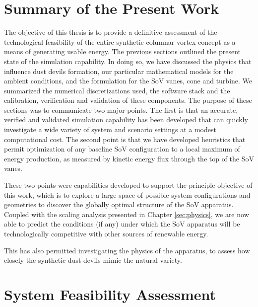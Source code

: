 \label{sec:conclusions}

%
%

%
%

\section{Summary of the Present Work}

The objective of this thesis is to provide a definitive assessment of
the technological feasibility of the entire synthetic columnar vortex
concept as a means of generating usable energy. The previous sections
outlined the present state of the simulation capability. In doing so, we
have discussed the physics that influence dust devils formation, our
particular mathematical models for the ambient conditions, and the
formulation for the SoV vanes, cone and turbine. We summarized the
numerical discretizations used, the software stack and the calibration,
verification and validation of these components. The purpose of these
sections was to communicate two major points. The first is that an
accurate, verified and validated simulation capability has been
developed that can quickly investigate a wide variety of system and
scenario settings at a modest computational cost. The second point is
that we have developed heuristics that permit optimization of any
baseline SoV configuration to a local maximum of energy production, as
measured by kinetic energy flux through the top of the SoV vanes.  

These two points were capabilities developed to support the principle
objective of this work, which is to explore a large space of possible
system configurations and geometries to discover the globally optimal
structure of the SoV apparatus. Coupled with the scaling analysis
presented in Chapter \ref{sec:physics}, we are now able to predict
the conditions (if any) under which the SoV apparatus will be
technologically competitive with other sources of renewable energy.  

This has also permitted investigating the physics of the apparatus, to
assess how closely the synthetic dust devils mimic the natural
variety. 

%
%
\section{System Feasibility Assessment}



